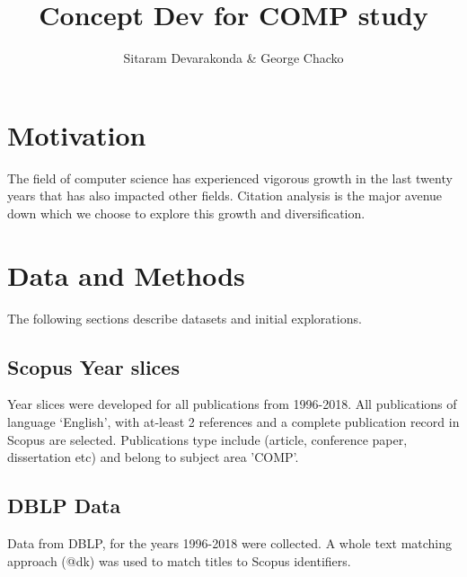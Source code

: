 \documentclass[11pt, oneside]{article}   	%
\title{Concept Dev for COMP study}
\author{Sitaram Devarakonda \& George Chacko}
\begin{document}
\maketitle
\section{Motivation} The field of computer science has experienced vigorous growth in the last twenty years that has also impacted other fields. Citation analysis is the major avenue down which we choose to explore this growth and diversification.

\section{Data and Methods} The following sections describe datasets and initial explorations.
\subsection{Scopus Year slices} Year slices were developed for all publications from 1996-2018. All publications of language `English', with at-least 2 references and a complete publication record in Scopus are selected. Publications type include (article, conference paper, dissertation etc) and belong to subject area 'COMP'. 
\subsection{DBLP Data} Data from DBLP, for the years 1996-2018 were collected. A whole text matching approach (@dk) was used to match titles to Scopus identifiers. 
\end{document}
